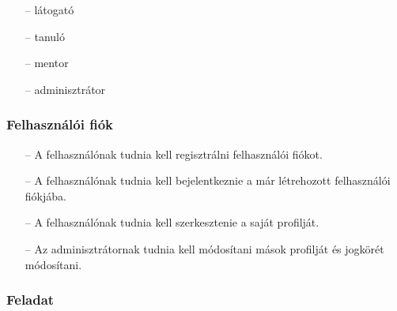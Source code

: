 





\begin{itemize}
    \item[--] látogató
    \item[--] tanuló
    \item[--] mentor
    \item[--] adminisztrátor
\end{itemize}


\subsubsection{Felhasználói fiók}

\begin{itemize}
    \item[--] A felhasználónak tudnia kell regisztrálni felhasználói fiókot.
    \item[--] A felhasználónak tudnia kell bejelentkeznie a már létrehozott felhasználói fiókjába.
    \item[--] A felhasználónak tudnia kell szerkesztenie a saját profilját.
    \item[--] Az adminisztrátornak tudnia kell módosítani mások profilját és jogkörét módosítani.
\end{itemize}

\subsubsection{Feladat}

